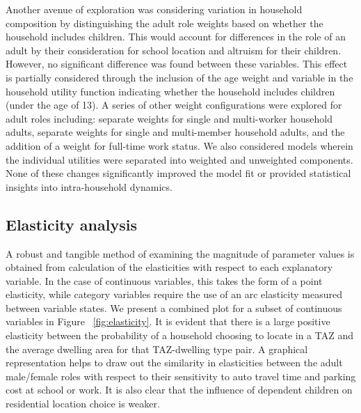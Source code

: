 Another avenue of exploration was considering variation in household composition by distinguishing the adult role weights based on whether the household includes children. This would account for differences in the role of an adult by their consideration for school location and altruism for their children. However, no significant difference was found between these variables. This effect is partially considered through the inclusion of the age weight and variable in the household utility function indicating whether the household includes children (under the age of 13). A series of other weight configurations were explored for adult roles including: separate weights for single and multi-worker household adults, separate weights for single and multi-member household adults, and the addition of a weight for full-time work status. We also considered models wherein the individual utilities were separated into weighted and unweighted components. None of these changes significantly improved the model fit or provided statistical insights into intra-household dynamics.

\subsection{Elasticity analysis}
A robust and tangible method of examining the magnitude of parameter values is obtained from calculation of the elasticities with respect to each explanatory variable. In the case of continuous variables, this takes the form of a point elasticity, while category variables require the use of an arc elasticity measured between variable states. We present a combined plot for a subset of continuous variables in Figure ~\ref{fig:elasticity}. It is evident that there is a large positive elasticity between the probability of a household choosing to locate in a TAZ and the average dwelling area for that TAZ-dwelling type pair. A graphical representation helps to draw out the similarity in elasticities between the adult male/female roles with respect to their sensitivity to auto travel time and parking cost at school or work. It is also clear that the influence of dependent children on residential location choice is weaker.

